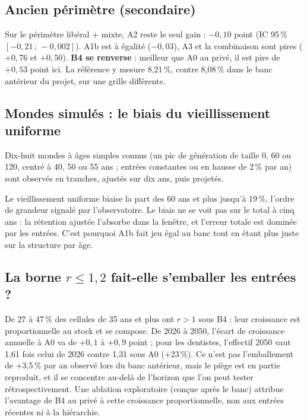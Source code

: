 \subsection{Ancien périmètre (secondaire)}
Sur le périmètre libéral + mixte, A2 reste le seul gain : $-0{,}10$\mesure{} point
(IC 95\,\% $[-0{,}21\,;\,-0{,}002]$\mesure). A1b est à égalité ($-0{,}03$\mesure), A3 et la combinaison
sont pires ($+0{,}76$ et $+0{,}50$\mesure). \textbf{B4 se renverse} : meilleur que A0 au privé, il est
pire de $+0{,}53$\mesure{} point ici. La référence y mesure 8,21\,\%\mesure, contre 8,08\,\% dans le banc
antérieur du projet, sur une grille différente.

\subsection{Mondes simulés : le biais du vieillissement uniforme}
Dix-huit mondes à âges simples connus (un pic de génération de taille 0, 60 ou 120, centré à 40, 50 ou
55 ans ; entrées constantes ou en hausse de 2\,\% par an\suppose) sont observés en tranches, ajustés
sur dix ans, puis projetés.
\begin{table}[h]
\centering\small
{}
\caption{Erreurs en \%, mesurées\mesure{} sur mondes simulés.}
\end{table}
Le vieillissement uniforme biaise la part des 60 ans et plus jusqu'à 19\,\%\mesure, l'ordre de grandeur
signalé par l'observatoire. Le biais ne se voit pas sur le total à cinq ans : la rétention ajustée
l'absorbe dans la fenêtre\derive, et l'erreur totale est dominée par les entrées. C'est pourquoi A1b
fait jeu égal au banc tout en étant plus juste sur la structure par âge.

\subsection{La borne $r \le 1{,}2$ fait-elle s'emballer les entrées ?}
De 27 à 47\,\%\mesure{} des cellules de 35 ans et plus ont $r > 1$ sous B4 : leur croissance est
proportionnelle au stock et se compose. De 2026 à 2050, l'écart de croissance annuelle à A0 va de
$+0{,}1$ à $+0{,}9$\mesure{} point ; pour les dentistes, l'effectif 2050 vaut 1,61 fois\mesure{}
celui de 2026 contre 1,31\mesure{} sous A0 (+23\,\%\mesure). Ce n'est pas l'emballement de
+3,5\,\% par an observé lors du banc antérieur, mais le piège est en partie reproduit, et il se
concentre au-delà de l'horizon que l'on peut tester rétrospectivement. Une ablation exploratoire
(conçue après le banc) attribue l'avantage de B4 au privé à cette croissance proportionnelle, non aux
entrées récentes ni à la hiérarchie.

